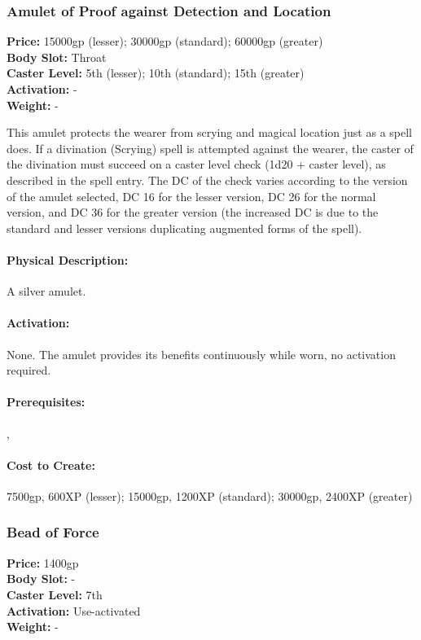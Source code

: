 \subsubsection{Amulet of Proof against Detection and Location}
   \textbf{Price:} 15000gp (lesser); 30000gp (standard); 60000gp (greater)
\\ \textbf{Body Slot:} Throat
\\ \textbf{Caster Level:} 5th (lesser); 10th (standard); 15th (greater)
\\ \textbf{Activation:} -
\\ \textbf{Weight:} -

This amulet protects the wearer from scrying and magical location just as a  spell does. If a divination (Scrying) spell is attempted against the wearer, the caster of the divination must succeed on a caster level check (1d20 + caster level), as described in the  spell entry. The DC of the check varies according to the version of the amulet selected, DC 16 for the lesser version, DC 26 for the normal version, and DC 36 for the greater version (the increased DC is due to the standard and lesser versions duplicating augmented forms of the  spell).

\paragraph{Physical Description:} A silver amulet.

\paragraph{Activation:} None. The amulet provides its benefits continuously while worn, no activation required.

\paragraph{Prerequisites:} , 

\paragraph{Cost to Create:} 7500gp, 600XP (lesser); 15000gp, 1200XP (standard); 30000gp, 2400XP (greater)

\subsubsection{Bead of Force}
   \textbf{Price:} 1400gp
\\ \textbf{Body Slot:} -
\\ \textbf{Caster Level:} 7th
\\ \textbf{Activation:} Use-activated
\\ \textbf{Weight:} -

